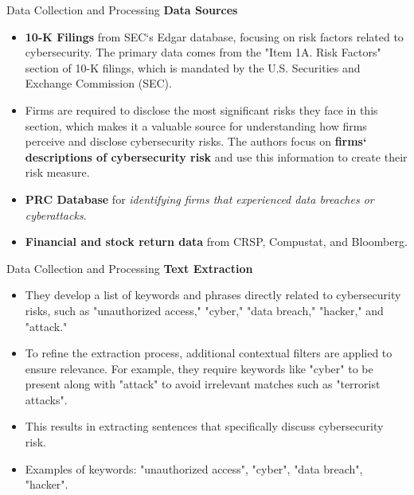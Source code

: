 \documentclass[11pt]{beamer}
\begin{document}
\begin{frame}{Data Collection and Processing}
\textbf{Data Sources}

	\begin{itemize}
		\item \textbf{10-K Filings} from SEC`s Edgar database, focusing on risk factors related to cybersecurity. The primary data comes from the "Item 1A. Risk Factors" section of 10-K filings, which is mandated by the U.S. Securities and Exchange Commission (SEC).

		\item Firms are required to disclose the most significant risks they face in this section, which makes it a valuable source for understanding how firms perceive and disclose cybersecurity risks. The authors focus on \textbf{firms` descriptions of cybersecurity risk} and use this information to create their risk measure.

		\item \textbf{PRC Database} for \textit{identifying firms that experienced data breaches or cyberattacks}.

		\item \textbf{Financial and stock return data} from CRSP, Compustat, and Bloomberg.
	\end{itemize}
\end{frame}
\begin{frame}{Data Collection and Processing}
\textbf{Text Extraction}

	\begin{itemize}
		\item They develop a list of keywords and phrases directly related to cybersecurity risks, such as "unauthorized access," "cyber," "data breach," "hacker," and "attack."

		\item To refine the extraction process, additional contextual filters are applied to ensure relevance. For example, they require keywords like "cyber" to be present along with "attack" to avoid irrelevant matches such as "terrorist attacks".

		\item This results in extracting sentences that specifically discuss cybersecurity risk.

		\item Examples of keywords: "unauthorized access", "cyber", "data breach", "hacker".

	\end{itemize}
\end{frame}
\end{document}
